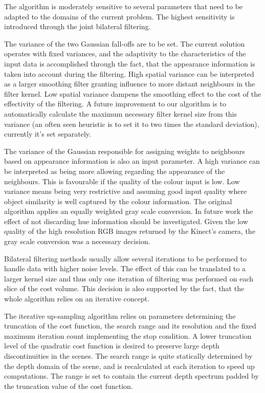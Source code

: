 \documentclass{ucl_thesis}
\begin{document}
\par The algorithm is moderately sensitive to several parameters that need to be adapted to the domains of the current problem. The highest sensitivity is introduced through the joint bilateral filtering. 

\par The variance of the two Gaussian fall-offs are to be set. The current solution operates with fixed variances, and the adaptivity to the characteristics of the input data is accomplished through the fact, that the appearance information is taken into account during the filtering. High spatial variance can be interpreted as a larger smoothing filter granting influence to more distant neighbours in the filter kernel. Low spatial variance dampens the smoothing effect to the cost of the effectivity of the filtering. A future improvement to our algorithm is to automatically calculate the maximum necessary filter kernel size from this variance (an often seen heuristic is to set it to two times the standard deviation), currently it's set separately.
\par The variance of the Gaussian responsible for assigning weights to neighbours based on appearance information is also an input parameter. A high variance can be interpreted as being more allowing regarding the appearance of the neighbours. This is favourable if the quality of the colour input is low. Low variance means being very restrictive and assuming good input quality where object similarity is well captured by the colour information. The original algorithm applies an equally weighted gray scale conversion. In future work the effect of not discarding hue information should be investigated. Given the low quality of the high resolution RGB images returned by the Kinect's camera, the gray scale conversion was a necessary decision.

\par Bilateral filtering methods usually allow several iterations to be performed to handle data with higher noise levels. The effect of this can be translated to a larger kernel size and thus only one iteration of filtering was performed on each slice of the cost volume. This decision is also supported by the fact, that the whole algorithm relies on an iterative concept.

\par The iterative up-sampling algorithm relies on parameters determining the truncation of the cost function, the search range and its resolution and the fixed maximum iteration count implementing the stop condition. A lower truncation level of the quadratic cost function is desired to preserve large depth discontinuities in the scenes. The search range is quite statically determined by the depth domain of the scene, and is recalculated at each iteration to speed up computations. The range is set to contain the current depth spectrum padded by the truncation value of the cost function. 
\end{document}
